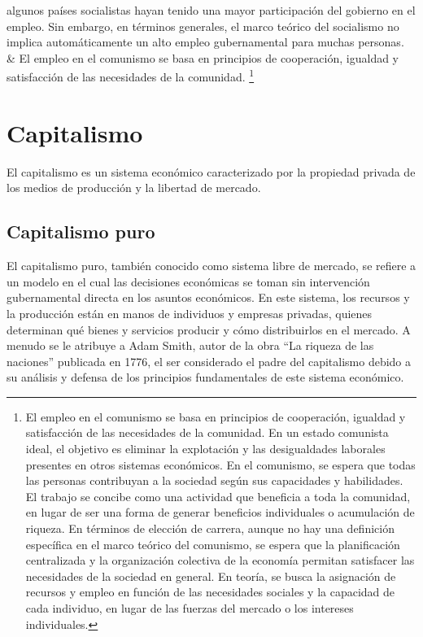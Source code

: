 \documentclass[
  man,
  floatsintext,
  longtable,
  a4paper,
  nolmodern,
  notxfonts,
  notimes,
  12pt,
  colorlinks=true,linkcolor=blue,citecolor=blue,urlcolor=blue]{apa7}
\begin{document}
{\begin{longtable}[]
{  algunos países socialistas hayan tenido una mayor participación del
  gobierno en el empleo. Sin embargo, en términos generales, el marco
  teórico del socialismo no implica automáticamente un alto empleo
  gubernamental para muchas personas.} & El empleo en el comunismo se
basa en principios de cooperación, igualdad y satisfacción de las
necesidades de la comunidad. \footnote{El empleo en el comunismo se basa
  en principios de cooperación, igualdad y satisfacción de las
  necesidades de la comunidad. En un estado comunista ideal, el objetivo
  es eliminar la explotación y las desigualdades laborales presentes en
  otros sistemas económicos. En el comunismo, se espera que todas las
  personas contribuyan a la sociedad según sus capacidades y
  habilidades. El trabajo se concibe como una actividad que beneficia a
  toda la comunidad, en lugar de ser una forma de generar beneficios
  individuales o acumulación de riqueza. En términos de elección de
  carrera, aunque no hay una definición específica en el marco teórico
  del comunismo, se espera que la planificación centralizada y la
  organización colectiva de la economía permitan satisfacer las
  necesidades de la sociedad en general. En teoría, se busca la
  asignación de recursos y empleo en función de las necesidades sociales
  y la capacidad de cada individuo, en lugar de las fuerzas del mercado
  o los intereses individuales.} \\
\end{longtable}
}

\section{Capitalismo}\label{capitalismo}

El capitalismo es un sistema económico caracterizado por la propiedad
privada de los medios de producción y la libertad de mercado.

\subsection{Capitalismo puro}\label{capitalismo-puro}

El capitalismo puro, también conocido como sistema libre de mercado, se
refiere a un modelo en el cual las decisiones económicas se toman sin
intervención gubernamental directa en los asuntos económicos. En este
sistema, los recursos y la producción están en manos de individuos y
empresas privadas, quienes determinan qué bienes y servicios producir y
cómo distribuirlos en el mercado. A menudo se le atribuye a Adam Smith,
autor de la obra ``La riqueza de las naciones'' publicada en 1776, el
ser considerado el padre del capitalismo debido a su análisis y defensa
de los principios fundamentales de este sistema económico.
\end{document}
